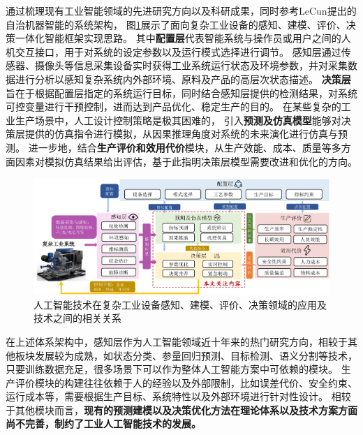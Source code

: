 通过梳理现有工业智能领域的先进研究方向以及科研成果，同时参考LeCun提出的自治机器智能的系统架构\cite{lecun2022path}，
图\ref{fig:industrial_ai}展示了面向复杂工业设备的感知、建模、评价、决策一体化智能框架实现思路。
其中\textbf{配置层}代表智能系统与操作员或用户之间的人机交互接口，用于对系统的设定参数以及运行模式选择进行调节。
感知层通过传感器、摄像头等信息采集设备实时获得工业系统运行状态及环境参数，并对采集数据进行分析以感知复杂系统内外部环境、原料及产品的高层次状态描述。
\textbf{决策层}旨在于根据配置层指定的系统运行目标，同时结合感知层提供的检测结果，对系统可控变量进行干预控制，进而达到产品优化、稳定生产的目的。
在某些复杂的工业生产场景中，人工设计控制策略是极其困难的，
引入\textbf{预测及仿真模型}能够对决策层提供的仿真指令进行模拟，从因果推理角度对系统的未来演化进行仿真与预测。
进一步地，结合\textbf{生产评价和效用代价}模块，从生产效能、成本、质量等多方面因素对模拟仿真结果给出评估，基于此指明决策层模型需要改进和优化的方向。

\begin{figure}
    \includegraphics[width=\linewidth]{figures/chapter1/industrial_ai.pdf}
    \caption{
        人工智能技术在复杂工业设备感知、建模、评价、决策领域的应用及技术之间的相关关系}
    \label{fig:industrial_ai}
\end{figure}

在上述体系架构中，感知层作为人工智能领域近十年来的热门研究方向，相较于其他板块发展较为成熟，如状态分类、参量回归预测、目标检测、语义分割等技术，只要训练数据充足，很多场景下可以作为整体人工智能方案中可依赖的模块。
生产评价模块的构建往往依赖于人的经验以及外部限制，比如误差代价、安全约束、运行成本等，需要根据生产目标、系统特性以及外部环境进行针对性设计。
相较于其他模块而言，\textbf{现有的预测建模以及决策优化方法在理论体系以及技术方案方面尚不完善，制约了工业人工智能技术的发展。}

